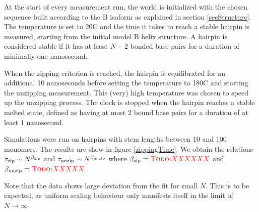 At the start of every measurement run, the world is initialized with the chosen sequence built according to the B isoform as explained in section \ref{secStructure}.
The temperature is set to 20{\degree}C and the time it takes to reach a stable hairpin is measured, starting from the initial model B helix structure.
A hairpin is considered stable if it has at least $N-2$ bonded base pairs for a duration of minimally one nanosecond.

When the zipping criterion is reached, the hairpin is equilibrated for an additional 10 nanoseconds before setting the temperature to 180{\degree}C and starting the unzipping measurement.
This (very) high temperature was chosen to speed up the unzipping process.
The clock is stopped when the hairpin reaches a stable melted state, defined as having at most 2 bound base pairs for a duration of at least 1 nanosecond.

Simulations were run on hairpins with stem lengths between 10 and 100 monomers. 
The results are show in figure \ref{zippingTime}. We obtain the relations ${\tau_\text{zip}} \sim N^{\beta_\text{zip}}$ and ${\tau_\text{unzip}} \sim N^{\beta_\text{unzip}}$ where ${\beta_\text{zip}} = \textcolor{red}{\textsc{Todo:} XXXXXX}$ and ${\beta_\text{unzip}} = \textcolor{red}{\textsc{Todo:} XXXXX}$

Note that the data shows large deviation from the fit for small $N$. This is to be expected, as uniform scaling behaviour only manifests itself in the limit of $N \to \infty$


